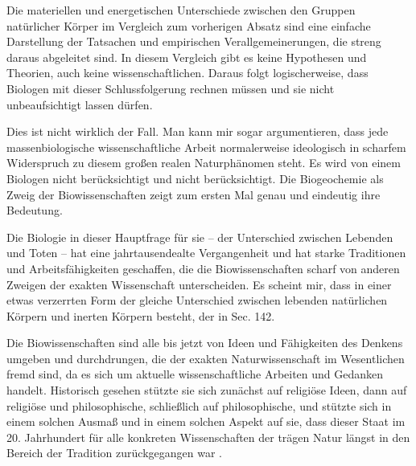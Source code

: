 \documentclass[11pt,a4paper]{book}
\begin{document}
Die materiellen und energetischen Unterschiede zwischen den Gruppen natürlicher Körper im Vergleich zum vorherigen Absatz sind eine einfache Darstellung der Tatsachen und empirischen Verallgemeinerungen, die streng daraus abgeleitet sind. In diesem Vergleich gibt es keine Hypothesen und Theorien, auch keine wissenschaftlichen. Daraus folgt logischerweise, dass Biologen mit dieser Schlussfolgerung rechnen müssen und sie nicht unbeaufsichtigt lassen dürfen.



Dies ist nicht wirklich der Fall. Man kann mir sogar argumentieren, dass jede massenbiologische wissenschaftliche Arbeit normalerweise ideologisch in scharfem Widerspruch zu diesem großen realen Naturphänomen steht. Es wird von einem Biologen nicht berücksichtigt und nicht berücksichtigt. Die Biogeochemie als Zweig der Biowissenschaften zeigt zum ersten Mal genau und eindeutig ihre Bedeutung.



Die Biologie in dieser Hauptfrage für sie -- der Unterschied zwischen Lebenden und Toten -- hat eine jahrtausendealte Vergangenheit und hat starke Traditionen und Arbeitsfähigkeiten geschaffen, die die Biowissenschaften scharf von anderen Zweigen der exakten Wissenschaft unterscheiden. Es scheint mir, dass in einer etwas verzerrten Form der gleiche Unterschied zwischen lebenden natürlichen Körpern und inerten Körpern besteht, der in Sec. 142.



Die Biowissenschaften sind alle bis jetzt von Ideen und Fähigkeiten des Denkens umgeben und durchdrungen, die der exakten Naturwissenschaft im Wesentlichen fremd sind, da es sich um aktuelle wissenschaftliche Arbeiten und Gedanken handelt. Historisch gesehen stützte sie sich zunächst auf religiöse Ideen, dann auf religiöse und philosophische, schließlich auf philosophische, und stützte sich in einem solchen Ausmaß und in einem solchen Aspekt auf sie, dass dieser Staat im 20. Jahrhundert für alle konkreten Wissenschaften der trägen Natur längst in den Bereich der Tradition zurückgegangen war .
\end{document}
